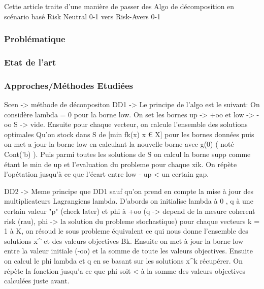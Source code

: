 \documentclass{beamer}
\begin{document}
	\begin{frame}
    	\end{frame}

        \begin{frame}
		\frametittle{Problématique}
            
            Cette article traite d'une manière de passer des Algo de décomposition en scénario basé Risk Neutral 0-1 
            vers Risk-Avers 0-1

        \end{frame}
        
        \begin{frame}

            \frametitle{Problématique}
           
        \end{frame}
        
        
        \begin{frame}
            \frametitle{Etat de l'art}
        \end{frame}
        
        \begin{frame}

            \frametitle{Approches/Méthodes Etudiées}
            	Scen -> méthode de déconpositon DD1 -> Le principe de l'algo est le suivant: On considère lambda = 0 pour la borne low. On set les bornes up -> +oo et low -> -oo S -> vide. Ensuite pour chaque vecteur, on calcule l'ensemble des solutions optimales Qu'on stock dans S de [min fk(x) x € X] pour les bornes données puis on met a jour la borne low en calculant la nouvelle borne avec g(0) ( noté Cont('b) ). Puis parmi toutes les solutions de S on calcul la borne supp comme étant le min de up et l'evaluation du probleme pour chaque xik. On répète l'opétation jusqu'à ce que l'écart entre low - up < un certain gap.
                
		DD2 -> Meme principe que DD1 sauf qu'on prend en compte la mise à jour des multiplicateurs Lagrangiens lambda. D'abords on initialise lambda à 0 , q à une certain valeur "p" (check later) et phi à +oo (q -> depend de la mesure coherent risk (rau), phi -> la solution du probleme stochastique) pour chaque vecteurs k = 1 à K, on résoud le sous probleme équivalent ce qui nous donne l'ensemble des solutions x^ et des valeurs objectives Bk. Ensuite on met à jour la borne low entre la valeur initiale (-oo) et la somme de toute les valeurs objectives. Ensuite on calcul le phi lambda et q  en se basant sur les solutions x^k récupérer. On répète la fonction jusqu'a ce que phi soit < à la somme des valeurs objectives calculées juste avant.
          
          
        \end{frame}
        
\end{document}
